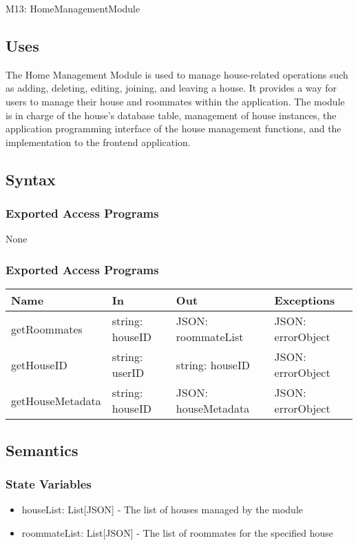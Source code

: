 \documentclass[12pt, titlepage]{article}
\begin{document}
M13: HomeManagementModule

\subsection{Uses}

The Home Management Module is used to manage house-related operations such as adding, deleting, editing, joining, and leaving a house. It provides a way for users to manage their house and roommates within the application. The module is in charge of the house's database table, management of house instances, the application programming interface of the house management functions, and the implementation to the frontend application.

\subsection{Syntax}

\subsubsection{Exported Access Programs}
None

\subsubsection{Exported Access Programs}

\begin{center}
\begin{tabular}{p{3cm} p{4cm} p{5cm} p{3.5cm}}
\hline
\textbf{Name} & \textbf{In} & \textbf{Out} & \textbf{Exceptions} \\
\hline
getRoommates & string: houseID & JSON: roommateList & JSON: errorObject \\
getHouseID & string: userID & string: houseID & JSON: errorObject \\
getHouseMetadata & string: houseID & JSON: houseMetadata & JSON: errorObject \\
\hline
\end{tabular}
\end{center}

\subsection{Semantics}

\subsubsection{State Variables}
\begin{itemize}
  \item houseList: List[JSON] - The list of houses managed by the module
  \item roommateList: List[JSON] - The list of roommates for the specified house
\end{itemize}
\end{document}
